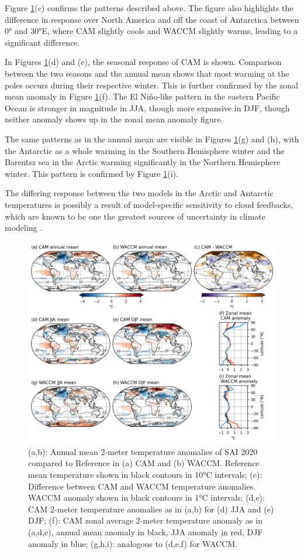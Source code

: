 Figure \ref{fig:TREFHT_20ref}(c) confirms the patterns described above. The figure also highlights the difference in response over North America and off the coast of Antarctica between 0° and 30°E, where CAM slightly cools and WACCM slightly warms, leading to a significant difference.

In Figures \ref{fig:TREFHT_20ref}(d) and (e), the seasonal response of CAM is shown. Comparison between the two seasons and the annual mean shows that most warming at the poles occurs during their respective winter. This is further confirmed by the zonal mean anomaly in Figure \ref{fig:TREFHT_20ref}(f). The El Ni\~no-like pattern in the eastern Pacific Ocean is stronger in magnitude in JJA, though more expansive in DJF, though neither anomaly shows up in the zonal mean anomaly figure. 

The same patterns as in the annual mean are visible in Figures \ref{fig:TREFHT_20ref}(g) and (h), with the Antarctic as a whole warming in the Southern Hemisphere winter and the Barentsz sea in the Arctic warming significantly in the Northern Hemisphere winter. This pattern is confirmed by Figure \ref{fig:TREFHT_20ref}(i). 

The differing response between the two models in the Arctic and Antarctic temperatures is possibly a result of model-specific sensitivity to cloud feedbacks, which are known to be one the greatest sources of uncertainty in climate modeling \parencite{schneider2017climate}.



\begin{figure}[H]
	\centering
	\includegraphics[width=0.95\linewidth]{images/TREFHT_20ref.png}
	\caption{(a,b): Annual mean 2-meter temperature anomalies of SAI 2020 compared to Reference in (a) CAM and (b) WACCM. Reference mean temperature shown in black contours in 10°C intervals; (c): Difference between CAM and WACCM temperature anomalies. WACCM anomaly shown in black contours in 1°C intervals; (d,e): CAM 2-meter temperature anomalies as in (a,b) for (d) JJA and (e) DJF; (f): CAM zonal average 2-meter temperature anomaly as in (a,d,e), annual mean anomaly in black, JJA anomaly in red, DJF anomaly in blue; (g,h,i): analogous to (d,e,f) for WACCM.}
	\label{fig:TREFHT_20ref}
\end{figure}


